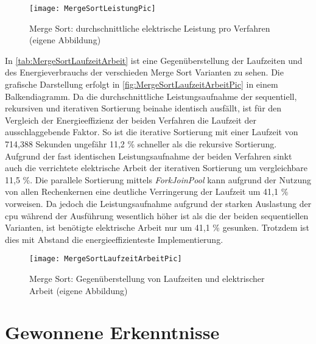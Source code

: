 \begin{figure}[H]
	\begin{center}	 
	\texttt{[image: MergeSortLeistungPic]}
	\caption{Merge Sort: durchschnittliche elektrische Leistung pro Verfahren (eigene Abbildung)}
	\label{fig:MergeSortLeistungPic}
	\end{center}
\end{figure}
In \autoref{tab:MergeSortLaufzeitArbeit} ist eine Gegenüberstellung der Laufzeiten und des Energieverbrauchs der verschieden Merge Sort Varianten zu sehen. Die grafische Darstellung erfolgt in \autoref{fig:MergeSortLaufzeitArbeitPic} in einem Balkendiagramm. Da die durchschnittliche Leistungsaufnahme der sequentiell, rekursiven und iterativen Sortierung beinahe identisch ausfällt, ist für den Vergleich der Energieeffizienz der beiden Verfahren die Laufzeit der ausschlaggebende Faktor. So ist die iterative Sortierung mit einer Laufzeit von 714,388 Sekunden ungefähr 11,2 \% schneller als die rekursive  Sortierung. Aufgrund der fast identischen Leistungsaufnahme der beiden Verfahren sinkt auch die verrichtete elektrische Arbeit der iterativen Sortierung um vergleichbare 11,5 \%. Die parallele Sortierung mittels \emph{ForkJoinPool} kann aufgrund der Nutzung von allen Rechenkernen eine deutliche Verringerung der Laufzeit um 41,1 \% vorweisen. Da jedoch die Leistungsaufnahme aufgrund der starken Auslastung der \ac{cpu} während der Ausführung wesentlich höher ist als die der beiden sequentiellen Varianten, ist benötigte elektrische Arbeit nur um 41,1 \% gesunken. Trotzdem ist dies mit Abstand die energieeffizienteste Implementierung.



\begin{figure}[H]
	\begin{center}	 
	\texttt{[image: MergeSortLaufzeitArbeitPic]}
	\caption{Merge Sort: Gegenüberstellung von Laufzeiten und elektrischer Arbeit (eigene Abbildung)}
	\label{fig:MergeSortLaufzeitArbeitPic} 
	\end{center}
\end{figure}

\section{Gewonnene Erkenntnisse}


